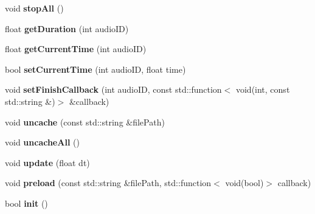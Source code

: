 \begin{DoxyCompactItemize}
void {\bfseries stop\+All} ()
\item 
\mbox{\label{classexperimental_1_1AudioEngineImpl_a12fa2f700f4d6e4effc72e1ad7e030cb}} 
float {\bfseries get\+Duration} (int audio\+ID)
\item 
\mbox{\label{classexperimental_1_1AudioEngineImpl_a47be5365efeebd307e3891f3f71386f0}} 
float {\bfseries get\+Current\+Time} (int audio\+ID)
\item 
\mbox{\label{classexperimental_1_1AudioEngineImpl_a8abd3b8330fb7ca7f513016055333f9c}} 
bool {\bfseries set\+Current\+Time} (int audio\+ID, float time)
\item 
\mbox{\label{classexperimental_1_1AudioEngineImpl_ab4bc0ee1754fda9638d7d0c4470cf170}} 
void {\bfseries set\+Finish\+Callback} (int audio\+ID, const std\+::function$<$ void(int, const std\+::string \&)$>$ \&callback)
\item 
\mbox{\label{classexperimental_1_1AudioEngineImpl_a4ad8d3d499bf3e5fd262d710b215891e}} 
void {\bfseries uncache} (const std\+::string \&file\+Path)
\item 
\mbox{\label{classexperimental_1_1AudioEngineImpl_ae439dacc5acebf311686ebf6f1f6b3df}} 
void {\bfseries uncache\+All} ()
\item 
\mbox{\label{classexperimental_1_1AudioEngineImpl_a0aa9187ac5e5341a505cf6154feceaee}} 
void {\bfseries update} (float dt)
\item 
\mbox{\label{classexperimental_1_1AudioEngineImpl_aa90d0fa798010a1a9029ab48db51b240}} 
void {\bfseries preload} (const std\+::string \&file\+Path, std\+::function$<$ void(bool)$>$ callback)
\item 
\mbox{\label{classexperimental_1_1AudioEngineImpl_a908e5136201a8a6b53ae5c292329f82b}} 
bool {\bfseries init} ()
\item 
\mbox{\label{classexperimental_1_1AudioEngineImpl_a04b788a8319f5d7f90e297a2a345f745}} 

\end{DoxyCompactItemize}
